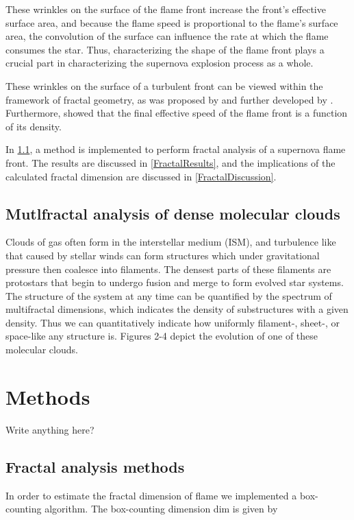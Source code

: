 \documentclass[iop]{emulateapj}
\begin{document}
These wrinkles on the surface of the flame front increase the front's effective surface area, and because the flame speed is proportional to the flame's surface area, the convolution of the surface can influence the rate at which the flame consumes the star. Thus, characterizing the shape of the flame front plays a crucial part in characterizing the supernova explosion process as a whole. 

These wrinkles on the surface of a turbulent front can be viewed within the framework of fractal geometry, as was proposed by \cite{Mandelbrot1975} and further developed by \cite{Timmes1994}. Furthermore, \cite{Timmes1994} showed that the final effective speed of the flame front is a function of its density.

In \textsection \ref{FractalMethods}, a method is implemented to perform fractal analysis of a supernova flame front. The results are discussed in \textsection \ref{FractalResults}, and the implications of the calculated fractal dimension are discussed in \textsection \ref{FractalDiscussion}.


\subsection{Mutlfractal analysis of dense molecular clouds}
Clouds of gas often form in the interstellar medium (ISM), and turbulence like that caused by stellar winds can form structures which under gravitational pressure then coalesce into filaments. The densest parts of these filaments are protostars that begin to undergo fusion and merge to form evolved star systems. The structure of the system at any time can be quantified by the spectrum of multifractal dimensions, which indicates the density of substructures with a given density. Thus we can quantitatively indicate how uniformly filament-, sheet-, or space-like any structure is. Figures 2-4 depict the evolution of one of these molecular clouds.

\section{Methods}\label{Methods}
{\Large Write anything here?}

\subsection{Fractal analysis methods}\label{FractalMethods}
In order to estimate the fractal dimension of flame we implemented a box-counting algorithm. The box-counting dimension dim is given by
\end{document}
